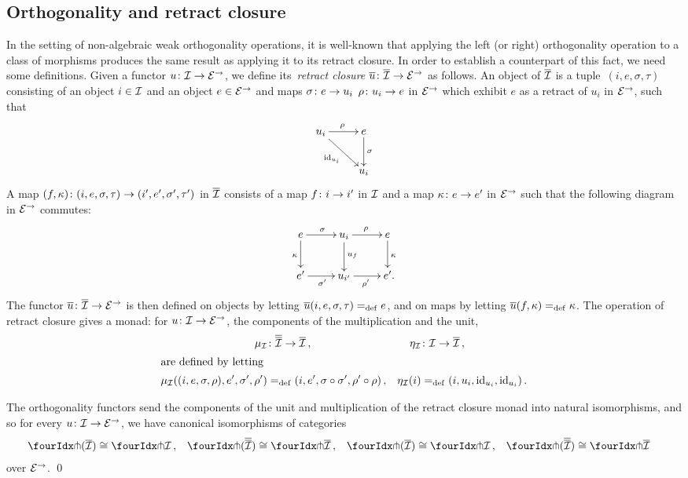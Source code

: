 \documentclass[reqno,10pt,a4paper,oneside,draft]{amsart}
\begin{document}
\subsection*{Orthogonality and retract closure}
In the setting of non-algebraic weak orthogonality operations, it is well-known that applying the left (or right) orthogonality operation to a class of morphisms produces the same result as applying it to its retract closure.
In order to establish a counterpart of this fact, we need some definitions.
Given a functor $u \co \cal{I} \to \calE^\to$, we define its~\emph{retract closure} $\overline{u} \co \overline{\cal{I}} \to \catE^\to$ as follows.
An object of $\overline{\cal{I}}$ is a tuple~$(i, e, \sigma, \tau)$ consisting of an object $i \in \cal{I}$ and an object $e \in \cal{E}^\to$ and maps $\sigma \co e \rightarrow u_i$ $\rho \co u_i \rightarrow e$ in $\cal{E}^\to$ which exhibit $e$ as a retract of $u_i$ in $\catE^\to$, \ie such that
\[
\xymatrix{
u_i \ar[r]^\rho \ar[dr]_{\id_{u_i}} & e \ar[d]^{\sigma} \\
  & u_i }
  \]
A map $(f, \kappa) \co (i, e, \sigma, \tau) \to (i', e', \sigma', \tau')$ in $\overline{\cal{I}}$ consists of a map $f \co i \to i'$ in $\cal{I}$ and a map $\kappa \co e \rightarrow e'$ in $\cal{E}^\to$ such that the following diagram in $\cal{E}^\to$ commutes:
\[
\xymatrix{
  e
  \ar[r]^{\sigma}
  \ar[d]_{\kappa}
&
  u_i
  \ar[r]^{\rho}
  \ar[d]^{u_f}
&
  e
  \ar[d]^{\kappa}
\\
  e'
  \ar[r]_{\sigma'}
&
  u_{i'}
  \ar[r]_{\rho'}
&
  e'
\rlap{.}}
\]
The functor $\overline{u} \co \overline{\cal{I}} \to \catE^\to$ is then defined on objects by letting $\overline{u}(i, e, \sigma, \tau) \defeq e$, and on maps by letting $\overline{u}(f, \kappa) \defeq \kappa$.
The operation of retract closure gives a monad: for $u \co \cal{I} \to \catE^\to$, the components of the multiplication and the unit,
\begin{align*}
  \mu_\cal{I} &\co \overline{\overline{\cal{I}}} \to \overline{\cal{I}}
\, , &
  \eta_\cal{I} &\co \cal{I} \to \overline{\cal{I}}
\, , \\
\intertext{are defined by letting}
  \mu_\cal{I}((i, e, \sigma, \rho), e', \sigma', \rho') &\defeq (i, e', \sigma \cc \sigma', \rho' \cc \rho)
\, , &
  \eta_\cal{I}(i) &\defeq (i, u_i, \id_{u_i}, \id_{u_i})
\, .
\end{align*}

\begin{proposition} \label{retract-closure}
The orthogonality functors send the components of the unit and multiplication of the retract closure monad into natural isomorphisms, and so for every $u \co \cal{I} \to \catE^\to$, we have canonical isomorphisms of categories
\begin{align*}
  \liftr{(\overline{\cal{I}})} &\iso \liftr{\cal{I}}
\, ,&
  \liftr{(\overline{\overline{\cal{I}}})} &\iso \liftr{\overline{\cal{I}}}
\, ,&
  \liftl{(\overline{\cal{I}})} &\iso \liftl{\cal{I}}
\, ,&
 \liftl{(\overline{\overline{\cal{I}}})} &\iso \liftl{\overline{\cal{I}}}
\end{align*}
over $\catE^\to$.
\qed
\end{proposition}
\end{document}

